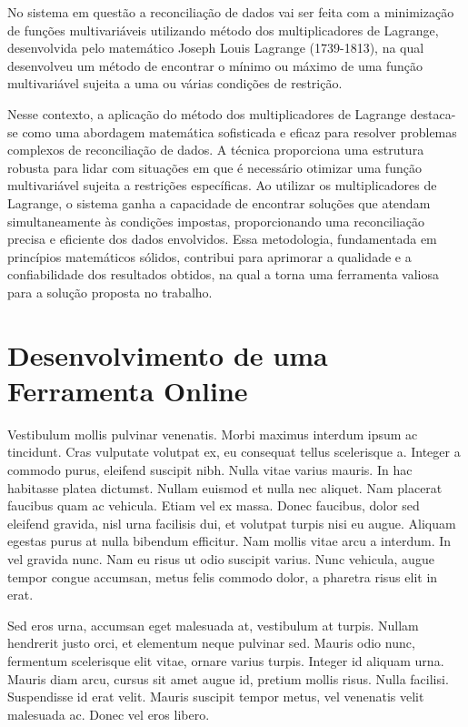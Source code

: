 No sistema em questão a reconciliação de dados vai ser feita com a minimização de funções multivariáveis utilizando método dos multiplicadores de Lagrange, desenvolvida pelo matemático Joseph Louis Lagrange (1739-1813), na qual desenvolveu um método de encontrar o mínimo ou máximo de uma função multivariável sujeita a uma ou várias condições de restrição.

Nesse contexto, a aplicação do método dos multiplicadores de Lagrange destaca-se como uma abordagem matemática sofisticada e eficaz para resolver problemas complexos de reconciliação de dados. A técnica proporciona uma estrutura robusta para lidar com situações em que é necessário otimizar uma função multivariável sujeita a restrições específicas. Ao utilizar os multiplicadores de Lagrange, o sistema ganha a capacidade de encontrar soluções que atendam simultaneamente às condições impostas, proporcionando uma reconciliação precisa e eficiente dos dados envolvidos. Essa metodologia, fundamentada em princípios matemáticos sólidos, contribui para aprimorar a qualidade e a confiabilidade dos resultados obtidos, na qual a torna uma ferramenta valiosa para a solução proposta no trabalho.

\section{Desenvolvimento de uma Ferramenta Online}

Vestibulum mollis pulvinar venenatis. Morbi maximus interdum ipsum ac tincidunt. Cras vulputate volutpat ex, eu consequat tellus scelerisque a. Integer a commodo purus, eleifend suscipit nibh. Nulla vitae varius mauris. In hac habitasse platea dictumst. Nullam euismod et nulla nec aliquet. Nam placerat faucibus quam ac vehicula. Etiam vel ex massa. Donec faucibus, dolor sed eleifend gravida, nisl urna facilisis dui, et volutpat turpis nisi eu augue. Aliquam egestas purus at nulla bibendum efficitur. Nam mollis vitae arcu a interdum. In vel gravida nunc. Nam eu risus ut odio suscipit varius. Nunc vehicula, augue tempor congue accumsan, metus felis commodo dolor, a pharetra risus elit in erat.

Sed eros urna, accumsan eget malesuada at, vestibulum at turpis. Nullam hendrerit justo orci, et elementum neque pulvinar sed. Mauris odio nunc, fermentum scelerisque elit vitae, ornare varius turpis. Integer id aliquam urna. Mauris diam arcu, cursus sit amet augue id, pretium mollis risus. Nulla facilisi. Suspendisse id erat velit. Mauris suscipit tempor metus, vel venenatis velit malesuada ac. Donec vel eros libero.

